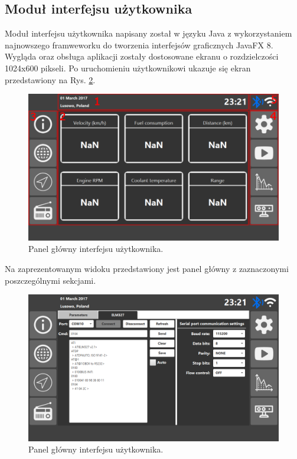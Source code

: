 \documentclass[12pt]{article} %
\numberwithin{equation}{subsection}
\numberwithin{figure}{section}
\numberwithin{table}{section}
\begin{document}
		
	
	\newpage
	
	
\subsection{Moduł interfejsu użytkownika}\label{rozdzial_hmi_software}
	\hspace{0.5cm}Moduł interfejsu użytkownika napisany został w języku Java z wykorzystaniem najnowszego framweworku do tworzenia interfejsów graficznych JavaFX 8. Wygląda oraz obsługa aplikacji zostały dostosowane ekranu o rozdzielczości 1024x600 pikseli. Po uruchomieniu użytkownikowi ukazuje się ekran przedstawiony na Rys. \ref{user_interface_dashboard}.
	
		\begin{figure}[!h]
			\centering
			\includegraphics[scale=0.4]{Images/user_interface_dashboard.png}
			\caption{Panel główny interfejsu użytkownika.}
			\label{user_interface_dashboard}
		\end{figure}
		
		Na zaprezentowanym widoku przedstawiony jest panel główny z zaznaczonymi poszczególnymi sekcjami. 
		
		\begin{figure}[!h]
			\centering
			\includegraphics[scale=0.5]{Images/user_interface_settings_elm_tab.png}
			\caption{Panel główny interfejsu użytkownika.}
			\label{user_interface_dashboard}
		\end{figure}
		
\end{document}
